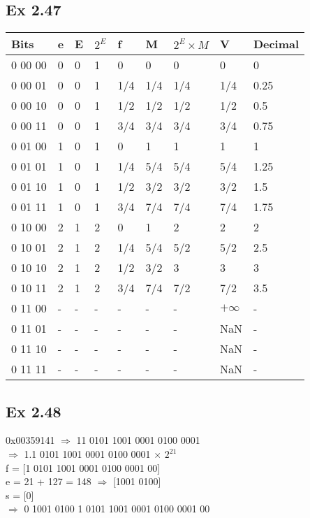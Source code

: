 \subsection{Ex 2.47}
\begin{table}[h]
    \centering
    \begin{tabular}{lllllllll}
        \toprule
         Bits & e & E & $2^E$ & f & M & $2^E\times M$ & V & Decimal \\
         \midrule
         0 00 00 & 0 & 0 & 1 & 0 & 0 & 0 & 0 & 0\\
         0 00 01 & 0 & 0 & 1 & 1/4 & 1/4 & 1/4 & 1/4 & 0.25\\
         0 00 10 & 0 & 0 & 1 & 1/2 & 1/2 & 1/2 & 1/2 & 0.5\\
         0 00 11 & 0 & 0 & 1 & 3/4 & 3/4 & 3/4 & 3/4 & 0.75\\
         0 01 00 & 1 & 0 & 1 & 0 & 1 & 1 & 1 & 1\\
         0 01 01 & 1 & 0 & 1 & 1/4 & 5/4 & 5/4 & 5/4 & 1.25\\
         0 01 10 & 1 & 0 & 1 & 1/2 & 3/2 & 3/2 & 3/2 & 1.5\\
         0 01 11 & 1 & 0 & 1 & 3/4 & 7/4 & 7/4 & 7/4 & 1.75\\
         0 10 00 & 2 & 1 & 2 & 0 & 1 & 2 & 2 & 2\\
         0 10 01 & 2 & 1 & 2 & 1/4 & 5/4 & 5/2 & 5/2 & 2.5\\
         0 10 10 & 2 & 1 & 2 & 1/2 & 3/2 & 3 & 3 & 3\\
         0 10 11 & 2 & 1 & 2 & 3/4 & 7/4 & 7/2 & 7/2 & 3.5\\
         0 11 00 & - & - & - & - & - & - & $+\infty$ & -\\
         0 11 01 & - & - & - & - & - & - & NaN & -\\
         0 11 10 & - & - & - & - & - & - & NaN & -\\ 
         0 11 11 & - & - & - & - & - & - & NaN & -\\
         \bottomrule
    \end{tabular}
\end{table}

\subsection{Ex 2.48}
0x00359141 $\Rightarrow$ 11 0101 1001 0001 0100 0001\\
$\Rightarrow$ 1.1 0101 1001 0001 0100 0001 $\times$ $2^{21}$\\
f = [1 0101 1001 0001 0100 0001 00]\\
e = 21 + 127 = 148 $\Rightarrow$ [1001 0100]\\
s = [0]\\
$\Rightarrow$ 0 1001 0100 1 0101 1001 0001 0100 0001 00

